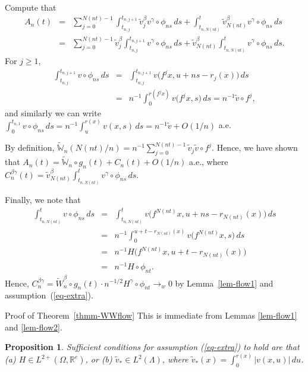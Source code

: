 \documentclass[aop,MSNbibl,seceqn,dvips]{arximspdf}
\newcommand{\eqref}[1]{(\ref{#1})}
\newtheorem{prop}[thmm]{Proposition}
\newcommand{\R}{\mathbb{R}}
\newcommand{\tildev}{\tilde{v}}
\newcommand{\tildeW}{\widetilde{W}}
\newcommand{\tildeBBW}{\widetilde{\mathbb W}}
\begin{document}
\begin{pf}
Compute that
%
\begin{eqnarray*}
A_n(t) & =&\sum_{j=0}^{N(nt)-1}\int
_{t_{n,j}}^{t_{n,j+1}}\tildev_j^\beta
v^\gamma\circ\phi_{ns} \,ds +\int_{t_{n,N(nt)}}^t
\tildev_{N(nt)}^\beta v^\gamma\circ\phi_{ns}
\,ds
\\
& =&\sum_{j=0}^{N(nt)-1}\tildev_j^\beta
\int_{t_{n,j}}^{t_{n,j+1}}v^\gamma\circ
\phi_{ns} \,ds +\tildev_{N(nt)}^\beta\int
_{t_{n,N(nt)}}^t v^\gamma\circ
\phi_{ns} \,ds.
\end{eqnarray*}
%
For $j\ge1$,
%
\begin{eqnarray*}
\int_{t_{n,j}}^{t_{n,j+1}}v\circ\phi_{ns} \,ds & =&
\int_{t_{n,j}}^{t_{n,j+1}}v\bigl(f^jx,u+ns-r_j(x)
\bigr) \,ds
\\
& =&n^{-1}\int_0^{r(f^jx)}v
\bigl(f^jx,s\bigr) \,ds =n^{-1}\tildev\circ f^j,
\end{eqnarray*}
%
and similarly we can write
$\int_0^{t_{n,1}}v\circ\phi_{ns} \,ds=n^{-1}\int_u^{r(x)}v(x,s)
\,ds=n^{-1}\tildev+O(1/n)$ a.e.

By definition, $\tildeBBW_n(N(nt)/n)=n^{-1}\sum_{j=0}^{N(nt)-1}\tildev
_j \tildev\circ f^j$.
Hence, we have shown that
$A_n(t)=\tildeBBW_n\circ g_n(t)+C_n(t)+O(1/n)$ a.e., where
$C_n^{\beta\gamma}(t)=\tildev_{N(nt)}^\beta\int_{t_{n,N(nt)}}^t
v^\gamma
\circ\phi_{ns} \,ds$.

Finally, we note that
%
\begin{eqnarray*}
 \int_{t_{n,N(nt)}}^t v\circ\phi_{ns} \,ds &=&
\int_{t_{n,N(nt)}}^t v\bigl(f^{N(nt)}x,u+ns-r_{N(nt)}(x)
\bigr) \,ds
\\
& = &n^{-1}\int_0^{u+t-r_{N(nt)}(x)}v
\bigl(f^{N(nt)}x,s\bigr) \,ds\\
&=&n^{-1}H\bigl(f^{N(nt)}x,u+t-r_{N(nt)}(x)
\bigr)
\\
& =&n^{-1}H\circ\phi_{nt}.
\end{eqnarray*}
%
Hence, $C_n^{\beta\gamma}=\tildeW_n^\beta\circ g_n(t)\cdot
n^{-1/2}H^\gamma\circ\phi_{nt}\to_w0$ by
Lemma~\ref{lem-flow1} and assumption~\eqref{eq-extra}.
\end{pf}

\begin{pf*}{Proof of Theorem~\ref{thmm-WWflow}}
This is immediate from Lemmas \ref{lem-flow1} and \ref{lem-flow2}.
\end{pf*}

\begin{prop} \label{prop-extra}
Sufficient conditions for assumption \eqref{eq-extra}
to hold are that
\textup{(a)} $H\in L^{2+}(\Omega,\R^e)$, or
\textup{(b)} $\tildev_*\in L^2(\Lambda)$,
where $\tildev_*(x)=\int_0^{r(x)}|v(x,u)| \,du$.
\end{prop}
\end{document}
